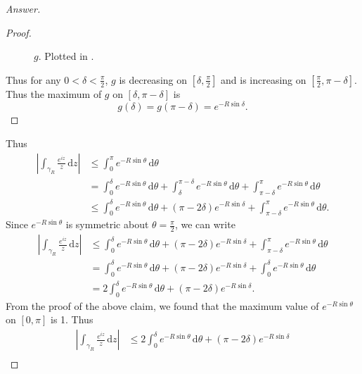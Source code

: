 \documentclass[12pt]{article}
\newcommand\paren[1]{\left( #1 \right)}
\newcommand{\sqbrack}[1]{\left [ #1 \right ]}
\theoremstyle{definition}
\begin{document}
\begin{enumerate}
\begin{proof}[Answer]
\begin{proof}
\begin{figure}[H]
                \caption{$g$. Plotted in \cite{Desmos}.}
                \label{fig:fig8}
            \end{figure}
            Thus for any $0 < \delta < \frac{\pi}{2}$, $g$ is decreasing on $\sqbrack{ \delta , \frac{\pi}{2} }$ and is increasing on $\sqbrack{ \frac{\pi}{2} , \pi - \delta }$. Thus the maximum of $g$ on $\sqbrack{ \delta , \pi - \delta }$ is 
            \[
                g(\delta) = g(\pi - \delta) = e^{-R \sin \delta}.
            \]
        \end{proof}
        Thus 
        \begin{align*}
            \left| \int_{\gamma_R} \frac{e^{iz}}{z} \, \mathrm{d}z \right| & \leq \int_0^{\pi} e^{ -R \sin \theta } \, \mathrm{d} \theta \\
            & = \int_0^{\delta} e^{ -R \sin \theta } \, \mathrm{d} \theta + \int_{\delta}^{\pi-\delta} e^{ -R \sin \theta } \, \mathrm{d} \theta + \int_{\pi - \delta}^{\pi} e^{ -R \sin \theta } \, \mathrm{d} \theta \\
            & \leq \int_0^{\delta} e^{ -R \sin \theta } \, \mathrm{d} \theta + \paren{ \pi - 2 \delta } e^{-R \sin \delta } + \int_{\pi - \delta}^{\pi} e^{ -R \sin \theta } \, \mathrm{d} \theta.
        \end{align*}
        Since $e^{ -R \sin \theta }$ is symmetric about $\theta = \frac{\pi}{2}$, we can write 
        \begin{align*}
            \left| \int_{\gamma_R} \frac{e^{iz}}{z} \, \mathrm{d}z \right| & \leq \int_0^{\delta} e^{ -R \sin \theta } \, \mathrm{d} \theta + \paren{ \pi - 2 \delta } e^{-R \sin \delta } + \int_{\pi - \delta}^{\pi} e^{ -R \sin \theta } \, \mathrm{d} \theta \\
            & = \int_0^{\delta} e^{ -R \sin \theta } \, \mathrm{d} \theta + \paren{ \pi - 2 \delta } e^{-R \sin \delta } + \int_{0}^{\delta} e^{ -R \sin \theta } \, \mathrm{d} \theta \\
            & = 2\int_0^{\delta} e^{ -R \sin \theta } \, \mathrm{d} \theta + \paren{ \pi - 2 \delta } e^{-R \sin \delta }.
        \end{align*}
        From the proof of the above claim, we found that the maximum value of $e^{-R \sin \theta}$ on $[0,\pi]$ is 1. Thus 
        \begin{align*}
            \left| \int_{\gamma_R} \frac{e^{iz}}{z} \, \mathrm{d}z \right| & \leq 2\int_0^{\delta} e^{ -R \sin \theta } \, \mathrm{d} \theta + \paren{ \pi - 2 \delta } e^{-R \sin \delta } \\

\end{align*}
\end{proof}
\end{enumerate}
\end{document}
